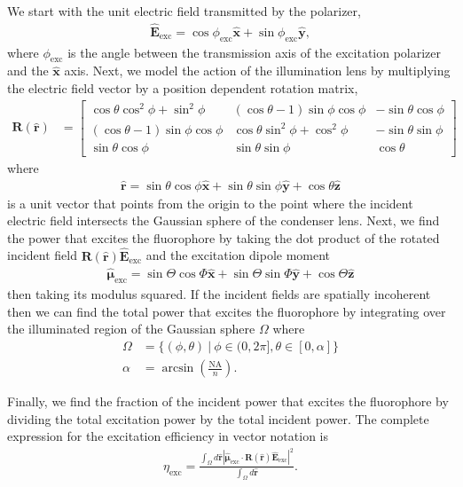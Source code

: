 \documentclass[10pt]{article}
\providecommand{\mb}[1]{\mathbf{#1}}
\providecommand{\mh}[1]{\mathbf{\hat{#1}}}
\providecommand{\bs}[1]{\boldsymbol{#1}}
\begin{document}
We start with the unit electric field transmitted by the polarizer,
\begin{align}
 \hat{\mb{E}}_{\text{exc}} = \cos\phi_{\text{exc}}\hat{\mb{x}} +
\sin\phi_{\text{exc}}\hat{\mb{y}},\label{eq:excfield}
\end{align}
where $\phi_{\text{exc}}$ is the angle between the transmission axis of the
excitation polarizer and the $\mh{x}$ axis. Next, we model the action of the
illumination lens by multiplying the electric field vector by a position
dependent rotation matrix,
  \begin{align}
  \mb{R}(\mh{r}) &= \begin{bmatrix} \cos\theta\cos^2\phi + \sin^2\phi & (\cos\theta -1)\sin\phi\cos\phi & -\sin\theta\cos\phi\\ (\cos\theta - 1)\sin\phi\cos\phi & \cos\theta\sin^2\phi + \cos^2\phi & -\sin\theta\sin\phi \\ \sin\theta\cos\phi& \sin\theta\sin\phi & \cos\theta \end{bmatrix}
  \end{align}
  where
  \begin{align}
   \hat{\mb{r}} = \sin\theta\cos\phi\hat{\mb{x}} + \sin\theta\sin\phi\hat{\mb{y}} + \cos\theta\hat{\mb{z}} 
  \end{align}
  is a unit vector that points from the origin to the point where the incident
  electric field intersects the Gaussian sphere of the condenser lens. Next, we
  find the power that excites the fluorophore by taking the dot product of the
  rotated incident field $\mb{R}(\mh{r})\mh{E}_{\text{exc}}$ and the excitation
  dipole moment
\begin{align}
  \hat{\bs{\mu}}_{\text{exc}} = \sin\Theta\cos\Phi\hat{\mb{x}} + \sin\Theta\sin\Phi\hat{\mb{y}} + \cos\Theta\hat{\mb{z}}
\end{align}
then taking its modulus squared. If the incident fields are spatially incoherent
then we can find the total power that excites the fluorophore by integrating over the
illuminated region of the Gaussian sphere $\Omega$ where
\begin{align}
  \Omega &= \{(\phi, \theta)\ |\ \phi \in (0,2\pi], \theta\in [0, \alpha]\} \\
  \alpha &= \arcsin\left(\frac{\text{NA}}{n}\right). \label{eq:alpha}
\end{align}

Finally, we find the fraction of the incident power that excites the fluorophore by
dividing the total excitation power by the total incident power. The complete expression for the excitation efficiency in vector notation is 
\begin{align}
  \eta_{\text{exc}} = \frac{\int_{\Omega}d\mh{r}|\hat{\bs{\mu}}_{\text{exc}}\cdot\mb{R}(\mh{r})\mh{E}_{\text{exc}}|^2}{\int_{\Omega}d\mh{r}}\label{eq:exc}. 
\end{align}
\end{document}

